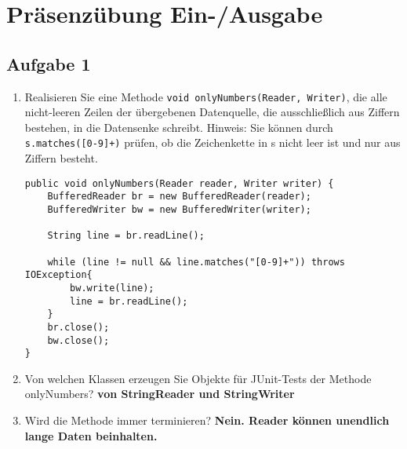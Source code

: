 \chapter{Präsenzübung Ein-/Ausgabe}

\section{Aufgabe 1}

\begin{enumerate}
    \item Realisieren Sie eine Methode \lstinline{void onlyNumbers(Reader, Writer)}, die
          alle nicht-leeren Zeilen der übergebenen Datenquelle, die ausschließlich aus
          Ziffern bestehen, in die Datensenke schreibt. Hinweis: Sie können durch
          \lstinline{s.matches([0-9]+)} prüfen, ob die Zeichenkette in s nicht leer ist
          und nur aus Ziffern besteht.
          \begin{lstlisting}
public void onlyNumbers(Reader reader, Writer writer) {
    BufferedReader br = new BufferedReader(reader);
    BufferedWriter bw = new BufferedWriter(writer);

    String line = br.readLine();

    while (line != null && line.matches("[0-9]+")) throws IOException{
        bw.write(line);
        line = br.readLine();
    }
    br.close();
    bw.close();
}
\end{lstlisting}
    \item Von welchen Klassen erzeugen Sie Objekte für JUnit-Tests der Methode
          onlyNumbers? \newline \textbf{von StringReader und StringWriter}
    \item Wird die Methode immer terminieren? \newline \textbf{Nein. Reader können
              unendlich lange Daten beinhalten.}
\end{enumerate}

\pagebreak

